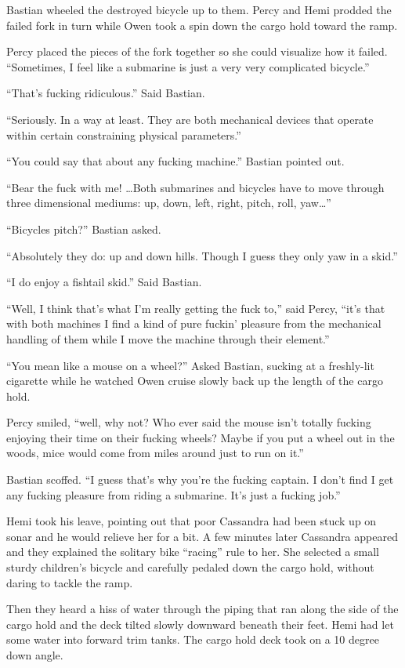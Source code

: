 \documentclass[]{scrbook}
\begin{document}
Bastian wheeled the destroyed bicycle up to them. Percy and Hemi prodded
the failed fork in turn while Owen took a spin down the cargo hold
toward the ramp.

Percy placed the pieces of the fork together so she could visualize how
it failed. ``Sometimes, I feel like a submarine is just a very very
complicated bicycle.''

``That's fucking ridiculous.'' Said Bastian.

``Seriously. In a way at least. They are both mechanical devices that
operate within certain constraining physical parameters.''

``You could say that about any fucking machine.'' Bastian pointed out.

``Bear the fuck with me! \ldots{}Both submarines and bicycles have to
move through three dimensional mediums: up, down, left, right, pitch,
roll, yaw\ldots{}''

``Bicycles pitch?'' Bastian asked.

``Absolutely they do: up and down hills. Though I guess they only yaw in
a skid.''

``I do enjoy a fishtail skid.'' Said Bastian.

``Well, I think that's what I'm really getting the fuck to,'' said
Percy, ``it's that with both machines I find a kind of pure fuckin'
pleasure from the mechanical handling of them while I move the machine
through their element.''

``You mean like a mouse on a wheel?'' Asked Bastian, sucking at a
freshly-lit cigarette while he watched Owen cruise slowly back up the
length of the cargo hold.

Percy smiled, ``well, why not? Who ever said the mouse isn't totally
fucking enjoying their time on their fucking wheels? Maybe if you put a
wheel out in the woods, mice would come from miles around just to run on
it.''

Bastian scoffed. ``I guess that's why you're the fucking captain. I
don't find I get any fucking pleasure from riding a submarine. It's just
a fucking job.''

Hemi took his leave, pointing out that poor Cassandra had been stuck up
on sonar and he would relieve her for a bit. A few minutes later
Cassandra appeared and they explained the solitary bike ``racing'' rule
to her. She selected a small sturdy children's bicycle and carefully
pedaled down the cargo hold, without daring to tackle the ramp.

Then they heard a hiss of water through the piping that ran along the
side of the cargo hold and the deck tilted slowly downward beneath their
feet. Hemi had let some water into forward trim tanks. The cargo hold
deck took on a 10 degree down angle.
\end{document}
